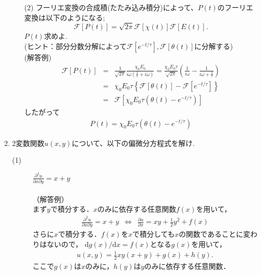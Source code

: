 \documentclass[11pt]{jsarticle}
\begin{document}
\begin{enumerate}
\begin{enumerate}
\newpage
\item[(2)] フーリエ変換の合成積(たたみ込み積分)によって、$P(t)$のフーリエ変換は以下のようになる;
\begin{equation*}
\mathcal{F}[P(t)]=\sqrt{2\pi}\mathcal{F}[\chi (t)]\mathcal{F}[E(t)].
\end{equation*}
$P(t)$求めよ.\\
(ヒント：部分分数分解によって$\mathcal{F}[e^{-t/\tau}],\mathcal{F}[\theta (t)]$に分解する)\\
(解答例)
\begin{eqnarray*}
\mathcal{F}[P(t)]&=&\frac{1}{\sqrt{2\pi}}\frac{\chi_{0}E_{0}}{i\omega \left( \frac{1}{\tau}+i\omega \right)}=\frac{\chi_{0}E_{0}\tau}{\sqrt{2\pi}}\left( \frac{1}{i\omega} - \frac{1}{i\omega+\frac{1}{\tau}} \right)\\
&=&\chi_{0}E_{0}\tau \left\{ \mathcal{F}[\theta(t)]-\mathcal{F}[e^{-t/\tau}] \right\}\\
&=&\mathcal{F}\left[ \chi_{0}E_{0}\tau \left( \theta(t) -e^{-t/\tau} \right) \right]
\end{eqnarray*}
したがって
\begin{eqnarray*}
P(t)=\chi_{0}E_{0}\tau \left( \theta(t) -e^{-t/\tau} \right)
\end{eqnarray*}


\end{enumerate}

\newpage
\item 2変数関数$u(x,y)$について、以下の偏微分方程式を解け.\\
\begin{description}
\item[(1)] $\displaystyle{\frac{{\partial}^2 u}{\partial x \partial y}=x+y}$\\
\\
（解答例）\\
まず$y$で積分する．$x$のみに依存する任意関数$f(x)$を用いて，
\begin{eqnarray*}
\frac{\partial^2 u}{\partial x \partial y} = x+y &\Leftrightarrow&
\frac{\partial u}{\partial x } = xy+\frac{1}{2}y^2 + f(x) 
\end{eqnarray*}
さらに$x$で積分する．$f(x)$を$x$で積分しても$x$の関数であることに変わりはないので，
$\mathrm{d}g(x)/\mathrm{d}x=f(x)$となる$g(x)$を用いて，
\begin{eqnarray*}
u(x,y) = \frac{1}{2}xy(x +y) + g(x) + h(y).
\end{eqnarray*}
ここで$g(x)$は$x$のみに，$h(y)$は$y$のみに依存する任意関数．\\


\end{description}
\end{enumerate}
\end{document}
